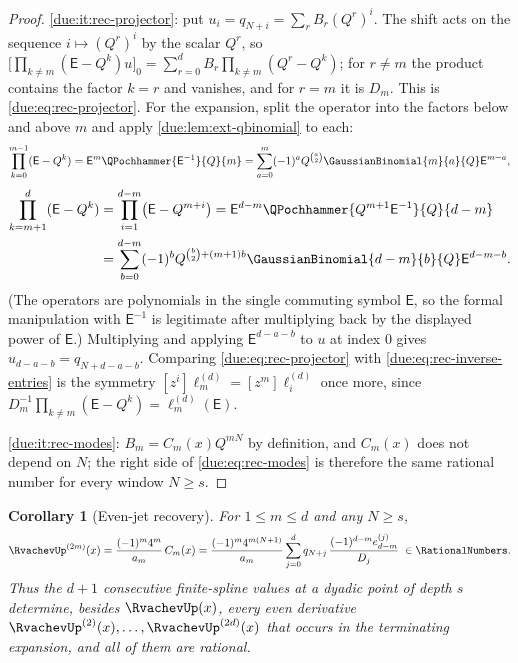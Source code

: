 \documentclass[11pt,oneside]{article}
\theoremstyle{plain}
\newtheorem{corollary}[theorem]{Corollary}
\theoremstyle{definition}
\theoremstyle{remark}
\newcommand{\upn}[1]{\RvachevUp_{#1}}
\newcommand{\Qq}{Q}                                         %
\newcommand{\am}[1]{a_{#1}}                                 %
\newcommand{\Cr}[2]{C_{#1}\!\left(#2\right)}                %
\newcommand{\qn}[1]{q_{#1}}                                 %
\begin{document}
\begin{proof}
\ref{due:it:rec-projector}: put $u_{i}=\qn{N+i}=\sum_{r}B_{r}(\Qq^{r})^{i}$.
The shift acts on the sequence $i\mapsto(\Qq^{r})^{i}$ by the scalar $\Qq^{r}$,
so
$\bigl[\prod_{k\ne m}(\mathsf E-\Qq^{k})u\bigr]_{0}
=\sum_{r=0}^{d}B_{r}\prod_{k\ne m}(\Qq^{r}-\Qq^{k})$; for $r\ne m$ the product
contains the factor $k=r$ and vanishes, and for $r=m$ it is $D_{m}$.  This is
\cref{due:eq:rec-projector}.  For the expansion, split the operator into the
factors below and above $m$ and apply \cref{due:lem:ext-qbinomial} to each:
\[
 \prod_{k=0}^{m-1}(\mathsf E-\Qq^{k})
 =\mathsf E^{m}\QPochhammer{\mathsf E^{-1}}{\Qq}{m}
 =\sum_{a=0}^{m}(-1)^{a}\Qq^{\binom{a}{2}}\GaussianBinomial{m}{a}{\Qq}\mathsf E^{m-a},
\]
\begin{align*}
 \prod_{k=m+1}^{d}(\mathsf E-\Qq^{k})
 &=\prod_{i=1}^{d-m}\bigl(\mathsf E-\Qq^{m+i}\bigr)
 =\mathsf E^{d-m}\QPochhammer{\Qq^{m+1}\mathsf E^{-1}}{\Qq}{d-m}\\
 &=\sum_{b=0}^{d-m}(-1)^{b}\Qq^{\binom{b}{2}+(m+1)b}
  \GaussianBinomial{d-m}{b}{\Qq}\mathsf E^{d-m-b}.
\end{align*}
(The operators are polynomials in the single commuting symbol $\mathsf E$, so
the formal manipulation with $\mathsf E^{-1}$ is legitimate after multiplying
back by the displayed power of $\mathsf E$.)  Multiplying and applying
$\mathsf E^{d-a-b}$ to $u$ at index $0$ gives $u_{d-a-b}=\qn{N+d-a-b}$.
Comparing \cref{due:eq:rec-projector} with \cref{due:eq:rec-inverse-entries}
is the symmetry $[z^{i}]\ell^{(d)}_{m}=[z^{m}]\ell^{(d)}_{i}$ once more, since
$D_{m}^{-1}\prod_{k\ne m}(\mathsf E-\Qq^{k})=\ell^{(d)}_{m}(\mathsf E)$.

\ref{due:it:rec-modes}: $B_{m}=\Cr{m}{x}\Qq^{mN}$ by definition, and
$\Cr{m}{x}$ does not depend on $N$; the right side of \cref{due:eq:rec-modes}
is therefore the same rational number for every window $N\ge s$.
\end{proof}

\begin{corollary}[Even-jet recovery]
\label{due:cor:rec-jet}
For $1\le m\le d$ and any $N\ge s$,
\begin{equation}
 \RvachevUp^{(2m)}(x)
 =\frac{(-1)^{m}4^{m}}{\am{m}}\,\Cr{m}{x}
 =\frac{(-1)^{m}4^{m(N+1)}}{\am{m}}
  \sum_{j=0}^{d}\qn{N+j}\,\frac{(-1)^{d-m}e^{(j)}_{d-m}}{D_{j}}
 \;\in\RationalNumbers.
 \label{due:eq:rec-jet}
\end{equation}
Thus the $d+1$ consecutive finite-spline values at a dyadic point of depth $s$
determine, besides $\RvachevUp(x)$, every even derivative
$\RvachevUp^{(2)}(x),\ldots,\RvachevUp^{(2d)}(x)$ that occurs in the
terminating expansion, and all of them are rational.
\end{corollary}
\end{document}
